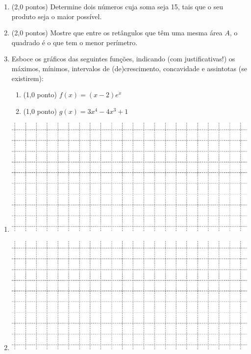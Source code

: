 \documentclass[12pt,a4paper]{article}
\newcommand{\fixme}{{\color{red}(...)}}
\begin{document}
\begin{enumerate}
\item (2,0 pontos) Determine dois números cuja soma seja 15, tais que o seu produto seja o maior possível.
\item (2,0 pontos) Mostre que entre os retângulos que têm uma mesma área $A$, o quadrado é o que tem o menor perímetro.

\item Esboce os gráficos das seguintes funções, indicando (com justificativas!) os máximos, mínimos, intervalos de  (de)crescimento, concavidade e assintotas (se existirem):
\begin{multicols}{2}
\begin{enumerate}
\item (1,0 ponto) $f(x) = (x - 2) e^x$
\item (1,0 ponto) $g(x) = 3x^4 - 4x^3 + 1$
\end{enumerate}
\end{multicols}

\end{enumerate}

\begin{enumerate}
\renewcommand{\theenumi}{\alph{enumi}}%
\item
\includegraphics[width=16.0cm]{img/prova-3-tads-1-fig-2}
\vspace{2em}
\item
\includegraphics[width=16.0cm]{img/prova-3-tads-1-fig-2}
\end{enumerate}
%
\end{document}
